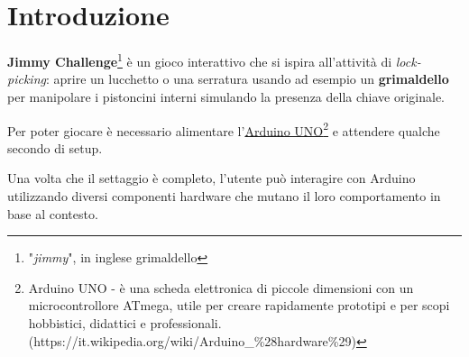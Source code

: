\chapter{Introduzione}
\textbf{Jimmy Challenge}\footnote{"\textit{jimmy}", in inglese grimaldello} è un gioco interattivo che si ispira all'attività di \textit{lock-picking}: aprire un lucchetto o una serratura usando ad esempio un \textbf{grimaldello} per manipolare i pistoncini interni simulando la presenza della chiave originale.

Per poter giocare è necessario alimentare l'\href{https://www.arduino.cc/en/Main/ArduinoBoardUno}{Arduino UNO\footnote{Arduino UNO - è una scheda elettronica di piccole dimensioni con un microcontrollore ATmega, utile per creare rapidamente prototipi e per scopi hobbistici, didattici e professionali. (\url{https://it.wikipedia.org/wiki/Arduino\_\%28hardware\%29})}} e attendere qualche secondo di setup.

Una volta che il settaggio è completo, l'utente può interagire con Arduino utilizzando diversi componenti hardware che mutano il loro comportamento in base al contesto.




